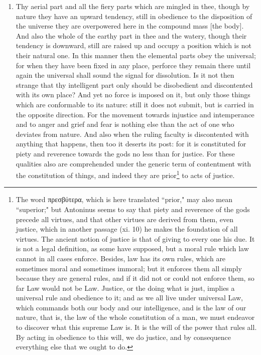 \begin{enumerate}
\item Thy aerial part and all the fiery parts which are mingled in thee, though by nature they have an upward tendency, still in obedience to the disposition of the universe they are overpowered here in the compound mass [{\clarify the body}]. And also the whole of the earthy part in thee and the watery, though their tendency is downward, still are raised up and occupy a position which is not their natural one. In this manner then the elemental parts obey the universal; for when they have been fixed in any place, perforce they remain there until again the universal shall sound the signal for dissolution. Is it not then strange that thy intelligent part only should be disobedient and discontented with its own place? And yet no force is imposed on it, but only those things which are conformable to its nature: still it does not submit, but is carried in the opposite direction. For the movement towards injustice and intemperance and to anger and grief and fear is nothing else than the act of one who deviates from nature. And also when the ruling faculty is discontented with anything that happens, then too it deserts its post: for it is constituted for piety and reverence towards the gods no less than for justice. For these qualities also are comprehended under the generic term of contentment with the constitution of things, and indeed they are prior\footnote{The word \textgreek{πρεσβύτερα}, which is here translated ``prior," may also mean ``superior;" but Antoninus seems to say that piety and reverence of the gods precede all virtues, and that other virtues are derived from them, even justice, which in another passage (xi. 10) he makes the foundation of all virtues. The ancient notion of justice is that of giving to every one his due. It is not a legal definition, as some have supposed, but a moral rule which law cannot in all cases enforce. Besides, law has its own rules, which are sometimes moral and sometimes immoral; but it enforces them all simply because they are general rules, and if it did not or could not enforce them, so far Law would not be Law. Justice, or the doing what is just, implies a universal rule and obedience to it; and as we all live under universal Law, which commands both our body and our intelligence, and is the law of our nature, that is, the law of the whole constitution of a man, we must endeavor to discover what this supreme Law is. It is the will of the power that rules all. By acting in obedience to this will, we do justice, and by consequence everything else that we ought to do.} to acts of justice.


\end{enumerate}
